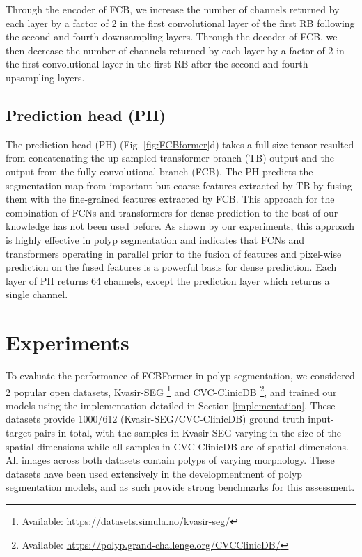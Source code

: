 \documentclass[runningheads]{llncs}
\begin{document}
Through the encoder of FCB, we increase the number of channels returned by each layer by a factor of 2 in the first convolutional layer of the first RB following the second and fourth downsampling layers. Through the decoder of FCB, we then decrease the number of channels returned by each layer by a factor of 2 in the first convolutional layer in the first RB after the second and fourth upsampling layers.

\subsection{Prediction head (PH)}
The prediction head (PH) (Fig. \ref{fig:FCBformer}d) takes a full-size tensor resulted from concatenating the up-sampled transformer branch (TB) output and the output from the fully convolutional branch (FCB). The PH predicts the segmentation map from important but coarse features extracted by TB by fusing them with the fine-grained features extracted by FCB. This approach for the combination of FCNs and transformers for dense prediction to the best of our knowledge has not been used before. As shown by our experiments, this approach is highly effective in polyp segmentation and indicates that FCNs and transformers operating in parallel prior to the fusion of features and pixel-wise prediction on the fused features is a powerful basis for dense prediction. Each layer of PH returns 64 channels, except the prediction layer which returns a single channel.

\section{Experiments}\label{sec:experiments}
To evaluate the performance of FCBFormer in polyp segmentation, we considered 2 popular open datasets, Kvasir-SEG \cite{kvasir}\footnote{Available: \url{https://datasets.simula.no/kvasir-seg/}} and CVC-ClinicDB \cite{cvc}\footnote{Available: \url{https://polyp.grand-challenge.org/CVCClinicDB/}}, and trained our models using the implementation detailed in Section \ref{implementation}. These datasets provide 1000/612 (Kvasir-SEG/CVC-ClinicDB) ground truth input-target pairs in total, with the samples in Kvasir-SEG varying in the size of the spatial dimensions while all samples in CVC-ClinicDB are of  spatial dimensions. All images across both datasets contain polyps of varying morphology. These datasets have been used extensively in the developmentment of polyp segmentation models, and as such provide strong benchmarks for this assessment.
\end{document}
